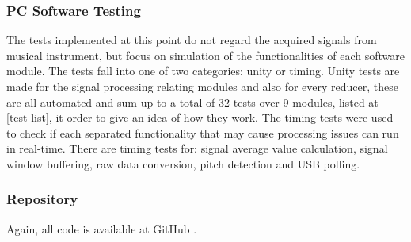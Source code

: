 \subsubsection{PC Software Testing}
The tests implemented at this point do not regard the acquired signals from musical instrument,
but focus on simulation of the functionalities of each software module.
The tests fall into one of two categories: unity or timing. Unity tests
are made for the signal processing relating modules and also for every reducer,
these are all automated and sum up to a total of 32 tests over 9 modules,
listed at \autoref{test-list}, it order to give an idea of how they work.
The timing tests were used to check if each separated functionality that may
cause processing issues can run in real-time. There are timing tests for: signal
average value calculation, signal window buffering, raw data conversion,
pitch detection and USB polling.

\subsubsection{Repository}
Again, all code is available at GitHub \cite{guitar-digitizer}.
